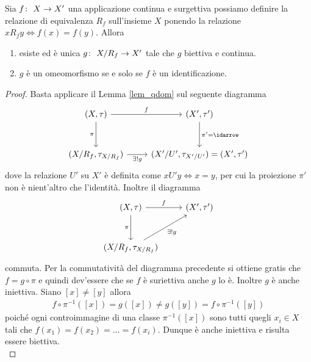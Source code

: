 \begin{theorem}
	Sia  $f \colon\ X \rightarrow X'$ una applicazione continua e surgettiva possiamo definire la relazione di equivalenza $R_f$ sull'insieme $X$ ponendo la relazione $xR_fy \Leftrightarrow f(x) = f(y)$. Allora 
	\begin{enumerate}
		\item esiste ed è unica $g \colon\ X/R_f \rightarrow X'$ tale che $g$ biettiva e continua.
		\item $g$ è un omeomorfismo se e solo se $f$ è un identificazione.
	\end{enumerate}
\end{theorem}
\begin{proof}
	Basta applicare il Lemma \ref{lem_qdom} sul seguente diagramma
	\begin{equation}
	\begin{tikzcd}[row sep = 3em]
		(X, \tau) \arrow[swap]{d}{\pi} \arrow{r}{f} & (X', \tau') \arrow{d}{\pi' = \idarrow}\\
		(X/R_f, \tau_{X/R_f}) \arrow[swap]{r}{\exists! g} & (X'/U', \tau_{X'/U'}) = (X', \tau')
	\end{tikzcd}	
	\end{equation}
	dove la relazione $U'$ su $X'$ è definita come $xU'y \Leftrightarrow x = y$, per cui la proiezione $\pi'$ non è nient'altro che l'identità. Inoltre il diagramma
	\begin{equation}
	\begin{tikzcd}[row sep = 3em]
		(X, \tau) \arrow[swap]{d}{\pi} \arrow{r}{f} & (X', \tau') \\
		(X/R_f, \tau_{X/R_f}) \arrow[swap]{ru}{\exists! g} &
	\end{tikzcd}	
	\end{equation}
	commuta. 
	Per la commutatività del diagramma precedente si ottiene gratis che $f = g \circ \pi$ e quindi dev'essere che se $f$ è suriettiva anche $g$ lo è. Inoltre $g$ è anche iniettiva. Siano $\left[x\right] \neq \left[y\right]$ allora 
	\begin{equation}
	\begin{aligned}
		f \circ \pi^{-1} (\left[x\right]) = g(\left[x\right]) \neq g(\left[y\right]) = f \circ \pi^{-1}(\left[y\right])
	\end{aligned}
	\end{equation}	
	poiché ogni controimmagine di una classe $\pi^{-1}(\left[x\right])$ sono tutti quegli $x_i \in X$ tali che $f(x_1) = f(x_2) = \dots = f(x_i)$. Dunque è anche iniettiva e risulta essere biettiva.\\
	

\end{proof}
